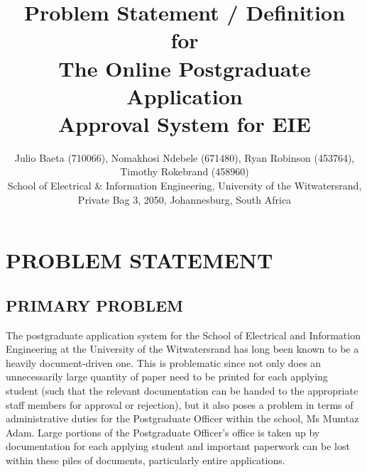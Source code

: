 \documentclass[journal,comsoc,onecolumn]{IEEEtran}
\begin{document}

\title{Problem Statement / Definition \\ \vspace{7mm} for \\ \vspace{7mm} The Online Postgraduate Application \\ Approval System for EIE}

\author{\vspace{3mm} Julio Baeta (710066), Nomakhosi Ndebele (671480), Ryan Robinson (453764), Timothy Rokebrand (458960)\\ \small \vspace{2mm} School of Electrical \& Information Engineering, University of the Witwatersrand, Private Bag 3, 2050, Johannesburg, South Africa}

\markboth{}{}

\maketitle

\thispagestyle{empty}


\newpage

\thispagestyle{empty}

\section{PROBLEM STATEMENT}


\subsection{PRIMARY PROBLEM}
The postgraduate application system for the School of Electrical and Information Engineering at the University of the Witwatersrand has long been known to be a heavily document-driven one. This is problematic since not only does an unnecessarily large quantity of paper need to be printed for each applying student (such that the relevant documentation can be handed to the appropriate staff members for approval or rejection), but it also poses a problem in terms of administrative duties for the Postgraduate Officer within the school, Ms Mumtaz Adam. Large portions of the Postgraduate Officer's office is taken up by documentation for each applying student and important paperwork can be lost within these piles of documents, particularly entire applications.
\end{document}
